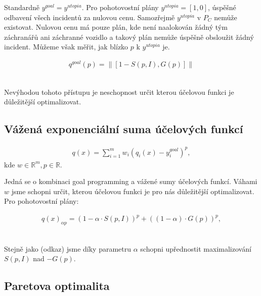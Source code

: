 Standardně $y^{goal} = y^{utopia}$.
Pro pohotovostní plány $y^{utopia} = [1, 0]$, úspěšné odbavení všech incidentů za nulovou cenu.
Samozřejmě $y^{utopia}$ v $P_C$ nemůže existovat.
Nulovou cenu má pouze plán, kde není naalokován žádný tým záchranářů ani záchranné vozidlo a takový plán nemůže úspěšně obsloužit žádný incident. 
Můžeme však měřit, jak blízko $p$ k $y^{utopia}$ je.

\begin{definice}
  \begin{align}
    q^{goal}(p) = \| [1 - S(p, I), G(p)] \|
  \end{align}
  \\
\end{definice}

Nevýhodou tohoto přístupu je neschopnost určit kterou účelovou funkci je důležitější optimalizovat.

\subsection{Vážená exponenciální suma účelových funkcí}

\begin{definice}
  \begin{align}
    q(x) = \sum_{i=1}^{m} w_i (q_i(x) - y_i^{goal})^p,
  \end{align}
  kde $w \in \mathbb{R}^m, p \in \mathbb{R}$.
  \\
\end{definice}

Jedná se o kombinaci goal programming a vážené sumy účelových funkcí.
Váhami $w$ jsme schopni určit, kterou účelovou funkci je pro nás důležitější optimalizovat. Pro pohotovostní plány:

\begin{definice}
  \begin{align}
    q(x)_{\alpha p} = (1 - \alpha \cdot S(p, I))^p + ((1 - \alpha) \cdot G(p))^p,
  \end{align}
  \\
\end{definice}

Stejně jako (odkaz) jsme díky parametru $\alpha$ schopni upřednostit maximalizování $S(p, I)$ nad $-G(p)$.

\subsection{Paretova optimalita}

